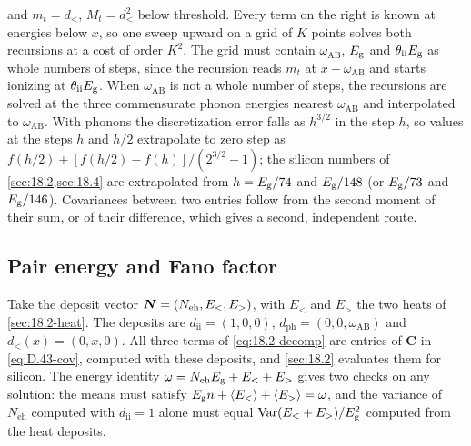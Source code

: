 and $m_t = d_<$, $M_t = d_<^2$ below threshold. Every term on the right is known at energies below $x$, so one sweep upward on a grid of $K$ points solves both recursions at a cost of order $K^2$. The grid must contain $\omega_{\mathrm{AB}}$, $E_{\mathrm{g}}$ and $\theta_{\mathrm{ii}}E_{\mathrm{g}}$ as whole numbers of steps, since the recursion reads $m_t$ at $x - \omega_{\mathrm{AB}}$ and starts ionizing at $\theta_{\mathrm{ii}}E_{\mathrm{g}}$. When $\omega_{\mathrm{AB}}$ is not a whole number of steps, the recursions are solved at the three commensurate phonon energies nearest $\omega_{\mathrm{AB}}$ and interpolated to $\omega_{\mathrm{AB}}$. With phonons the discretization error falls as $h^{3/2}$ in the step $h$, so values at the steps $h$ and $h/2$ extrapolate to zero step as $f(h/2) + [f(h/2) - f(h)]/(2^{3/2} - 1)$; the silicon numbers of \cref{sec:18.2,sec:18.4} are extrapolated from $h = E_{\mathrm{g}}/74$ and $E_{\mathrm{g}}/148$ (or $E_{\mathrm{g}}/73$ and $E_{\mathrm{g}}/146$). Covariances between two entries follow from the second moment of their sum, or of their difference, which gives a second, independent route.

\subsection{Pair energy and Fano factor}

Take the deposit vector $\bm{N} = (N_{\mathrm{eh}}, E_<, E_>)$, with $E_<$ and $E_>$ the two heats of \cref{sec:18.2-heat}. The deposits are $d_{\mathrm{ii}} = (1, 0, 0)$, $d_{\mathrm{ph}} = (0, 0, \omega_{\mathrm{AB}})$ and $d_<(x) = (0, x, 0)$. All three terms of \cref{eq:18.2-decomp} are entries of $\mathbf{C}$ in \cref{eq:D.43-cov}, computed with these deposits, and \cref{sec:18.2} evaluates them for silicon. The energy identity $\omega = N_{\mathrm{eh}}E_{\mathrm{g}} + E_< + E_>$ gives two checks on any solution: the means must satisfy $E_{\mathrm{g}}\bar n + \langle E_<\rangle + \langle E_>\rangle = \omega$, and the variance of $N_{\mathrm{eh}}$ computed with $d_{\mathrm{ii}} = 1$ alone must equal $\operatorname{Var}(E_< + E_>)/E_{\mathrm{g}}^2$ computed from the heat deposits.

